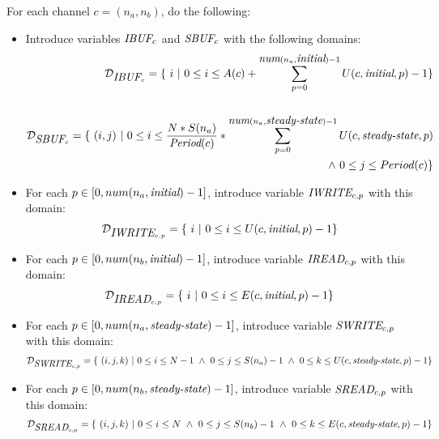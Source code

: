 For each channel $c = (n_a, n_b)$, do the following:
\begin{itemize}

\item Introduce variables $\mbox{\it IBUF}_c$ and $\mbox{\it SBUF}_c$ with the following domains:
\begin{align*}
{\cal D}_{\mt{IBUF}_c} = \{~i~|~0 \le i \le A(c) +
\sum_{p=0}^{\mt{num}(n_a, \mt{initial})-1} U(c, \mt{initial}, p) - 1\} \\ ~ \\
%
{\cal D}_{\mt{SBUF}_c} = \{~(i,j)~|~0 \le i \le \frac{N *
S(n_a)}{\mt{Period}(c)} * \sum_{p=0}^{\mt{num}(n_a,
\mt{steady-state})-1} U(c, \mt{steady-state}, p) \\
\wedge~0 \le j \le Period(c) \}
\end{align*}

\item For each $p \in [0, num(n_a, \mbox{\it initial})-1]$, introduce
variable $\mbox{\it IWRITE}_{c, p}$ with this domain:
\begin{align*}
{\cal D}_{\mbox{\it IWRITE}_{c, p}} = \{~i~|~0 \le i \le U(c, \mbox{\it initial}, p) - 1\} \\
\end{align*}

\item For each $p \in [0, num(n_b, \mbox{\it initial})-1]$, introduce
variable $\mbox{\it IREAD}_{c, p}$ with this domain:
\begin{align*}
{\cal D}_{\mbox{\it IREAD}_{c, p}} = \{~i~|~0 \le i \le E(c, \mbox{\it initial}, p) - 1\} \\
\end{align*}

\item For each $p \in [0, num(n_a, \mbox{\it steady-state})-1]$, introduce
variable $\mbox{\it SWRITE}_{c, p}$ with this domain:
\begin{align*}
{\cal D}_{\mbox{\it SWRITE}_{c, p}} = \{~(i,j,k)~|~0 \le i \le N-1 ~\wedge~ 0 \le j \le S(n_a) - 1 ~\wedge~ 0 \le k \le U(c, \mbox{\it steady-state}, p) - 1\} \\
\end{align*}

\item For each $p \in [0, num(n_b, \mbox{\it steady-state})-1]$, introduce
variable $\mbox{\it SREAD}_{c, p}$ with this domain:
\begin{align*}
{\cal D}_{\mbox{\it SREAD}_{c, p}} = \{~(i,j,k)~|~0 \le i \le N ~\wedge~ 0 \le j \le S(n_b) - 1 ~\wedge~ 0 \le k \le E(c, \mbox{\it steady-state}, p) - 1\} \\
\end{align*}


\end{itemize}
